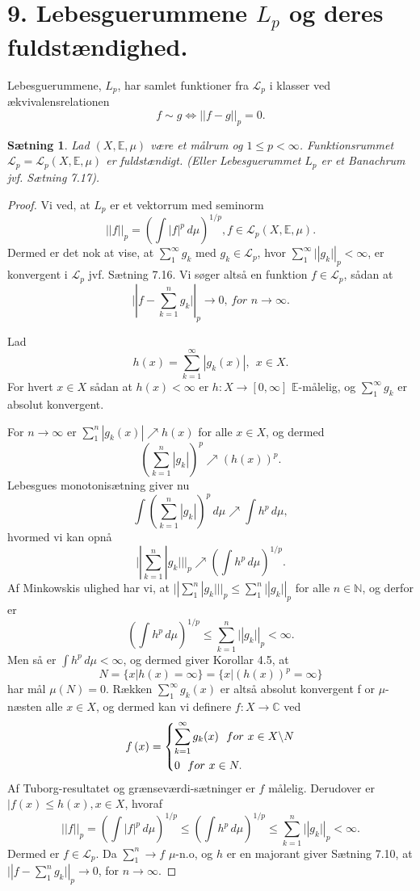\documentclass[12pt]{report}
\newtheorem{theorem}[lemma]{Sætning}
\theoremstyle{break}
\newtheorem*{proof}{Bevis}
\theoremstyle{break}
\newcommand{\Int}[1]{\int#1\,d\mu}
\newcommand{\EE}{\mathbb{E}}
\renewcommand{\L}{\mathcal{L}}
\newcommand{\laengde}[1]{\lvert|#1\rvert|}
\begin{document}
\section*{9. Lebesguerummene $L_p$ og deres fuldstændighed.}
Lebesguerummene, $L_p$, har samlet funktioner fra $\L_p$ i klasser ved ækvivalensrelationen \[f\sim g\Leftrightarrow\laengde{f-g}_p=0.\]
\begin{theorem}
Lad $(X,\EE,\mu)$ være et målrum og $1\leq p<\infty$. Funktionsrummet $\L_p=\L_p(X,\EE,\mu)$ er fuldstændigt. (Eller Lebesguerummet $L_p$ er et Banachrum jvf. Sætning 7.17).
\end{theorem}
\begin{proof}
Vi ved, at $L_p$ er et vektorrum med seminorm \[\laengde{f}_p=\left(\Int{|f|^p}\right)^{1/p}, f\in\L_p(X,\EE,\mu).\] Dermed er det nok at vise, at  $\sum_1^\infty g_k$ med $g_k\in\L_p$, hvor $\sum_1^\infty \laengde{g_k}_p < \infty$, er konvergent i $\L_p$ jvf. Sætning 7.16. Vi søger altså en funktion $f\in\L_p$, sådan at \[\laengde{f-\sum\limits_{k=1}^ng_k}_p\to 0,\, for\,\,n\to\infty.\]

\bigskip

Lad \[h(x)=\sum\limits_{k=1}^\infty|g_k(x)|,~~x\in X.\]
For hvert $x\in X$ sådan at $h(x)<\infty$ er $h\colon X\to[0,\infty]$ $\EE$-målelig, og $\sum_1^\infty g_k$ er absolut konvergent.

\bigskip

For $n\to\infty$ er $\sum_1^n|g_k(x)|\nearrow h(x)$ for alle $x\in X$, og dermed
\[\left(\sum\limits_{k=1}^n|g_k|\right)^p\nearrow (h(x))^p.\]
Lebesgues monotonisætning giver nu
\[\Int{\left(\sum\limits_{k=1}^n|g_k|\right)^p}\nearrow\Int{h^p},\]
hvormed vi kan opnå
\[\laengde{\sum\limits_{k=1}^n|g_k|}_p\nearrow\left(\Int{h^p}\right)^{1/p}.\]
Af Minkowskis ulighed har vi, at $\laengde{\sum_1^n|g_k|}_p\leq\sum_1^n\laengde{g_k}_p$ for alle $n\in\mathbb{N}$, og derfor er
\[\left(\Int{h^p}\right)^{1/p}\leq \sum\limits_{k=1}^n\laengde{g_k}_p<\infty.\]
Men så er $\Int{h^p}<\infty$, og dermed giver Korollar 4.5, at 
\[N=\{x\vert h(x)=\infty\}=\{x\vert (h(x))^p=\infty\}\]
har mål $\mu(N)=0$. Rækken $\sum_1^\infty g_k(x)$ er altså absolut konvergent f or $\mu$-næsten alle $x\in X$, og dermed kan vi definere $f\colon X\to\mathbb{C}$ ved
\[f\left( x \right) = \left\{ \begin{gathered}
  \sum_{k=1}^\infty g_k(x) \hfill ~~for\,\, x\in X\backslash N \\
  0~~for\,\, x\in N. \hfill \\ 
\end{gathered}  \right.\]
Af Tuborg-resultatet og grænseværdi-sætninger er $f$ målelig. Derudover er $|f(x)\leq h(x), x\in X$, hvoraf
\[\laengde{f}_p=\left(\Int{|f|^p}\right)^{1/p}\leq\left(\Int{h^p}\right)^{1/p}\leq\sum\limits_{k=1}^n\laengde{g_k}_p<\infty.\]
Dermed er $f\in\L_p$. Da $\sum_1^n\to f$ $\mu$-n.o, og $h$ er en majorant giver Sætning 7.10, at $\laengde{f-\sum_1^n g_k}_p\to 0$, for $n\to\infty$.
\end{proof}
\end{document}
